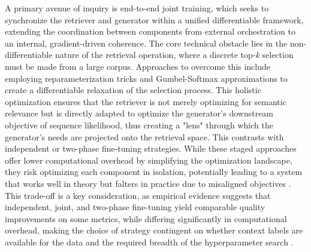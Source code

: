 \documentclass[11pt,a4paper]{article}
\begin{document}
A primary avenue of inquiry is end-to-end joint training, which seeks to synchronize the retriever and generator within a unified differentiable framework, extending the coordination between components from external orchestration to an internal, gradient-driven coherence. The core technical obstacle lies in the non-differentiable nature of the retrieval operation, where a discrete top-\emph{k} selection must be made from a large corpus. Approaches to overcome this include employing reparameterization tricks and Gumbel-Softmax approximations to create a differentiable relaxation of the selection process. This holistic optimization ensures that the retriever is not merely optimizing for semantic relevance but is directly adapted to optimize the generator's downstream objective of sequence likelihood, thus creating a "lens" through which the generator's needs are projected onto the retrieval space. This contrasts with independent or two-phase fine-tuning strategies. While these staged approaches offer lower computational overhead by simplifying the optimization landscape, they risk optimizing each component in isolation, potentially leading to a system that works well in theory but falters in practice due to misaligned objectives \cite{arxiv:2510.01600v2}. This trade-off is a key consideration, as empirical evidence suggests that independent, joint, and two-phase fine-tuning yield comparable quality improvements on some metrics, while differing significantly in computational overhead, making the choice of strategy contingent on whether context labels are available for the data and the required breadth of the hyperparameter search \cite{arxiv:2510.01600v2}.
\end{document}
